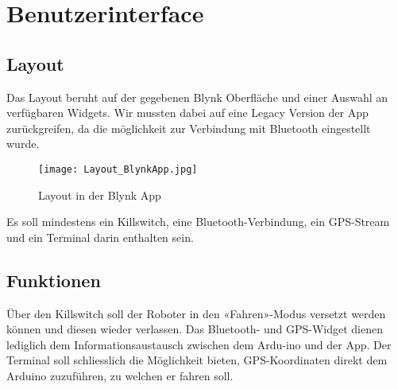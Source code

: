\section{Benutzerinterface}

\subsection{Layout}
Das Layout beruht auf der gegebenen Blynk Oberfläche und einer Auswahl an verfügbaren Widgets. Wir mussten dabei auf eine Legacy Version der App zurückgreifen, da die möglichkeit zur Verbindung mit Bluetooth eingestellt wurde.

\begin{figure}[H]
    \begin{center}
    \texttt{[image: Layout\_BlynkApp.jpg]}
    \end{center}
    \caption{Layout in der Blynk App}
\end{figure}

Es soll mindestens ein Killswitch, eine Bluetooth-Verbindung, ein GPS-Stream und ein Terminal darin enthalten sein.

\subsection{Funktionen}
Über den Killswitch soll der Roboter in den «Fahren»-Modus versetzt werden können und diesen wieder verlassen. Das Bluetooth- und GPS-Widget dienen lediglich dem Informationsaustausch zwischen dem Ardu-ino und der App. Der Terminal soll schliesslich die Möglichkeit bieten, GPS-Koordinaten direkt dem Arduino zuzuführen, zu welchen er fahren soll.